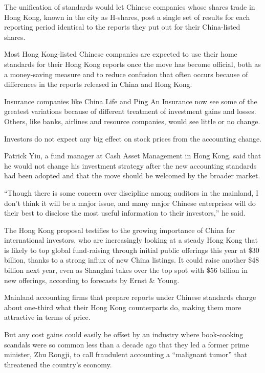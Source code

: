 ﻿\documentclass[12pt]{article}
\begin{document}
The unification of standards would let Chinese companies whose shares trade in Hong Kong, known in
the city as H-shares, post a single set of results for each reporting period identical to the
reports they put out for their China-listed shares.

Most Hong Kong-listed Chinese companies are expected to use their home standards for their Hong Kong
reports once the move has become official, both as a money-saving measure and to reduce confusion
that often occurs because of differences in the reports released in China and Hong Kong.

Insurance companies like China Life and Ping An Insurance now see some of the greatest variations
because of different treatment of investment gains and losses. Others, like banks, airlines and
resource companies, would see little or no change.

Investors do not expect any big effect on stock prices from the accounting change.

Patrick Yiu, a fund manager at Cash Asset Management in Hong Kong, said that he would not change his
investment strategy after the new accounting standards had been adopted and that the move should be
welcomed by the broader market.

``Though there is some concern over discipline among auditors in the mainland, I don't think it will
be a major issue, and many major Chinese enterprises will do their best to disclose the most useful
information to their investors,'' he said.

The Hong Kong proposal testifies to the growing importance of China for international investors, who
are increasingly looking at a steady Hong Kong that is likely to top global fund-raising through
initial public offerings this year at \$30 billion, thanks to a strong influx of new China listings.
It could raise another \$48 billion next year, even as Shanghai takes over the top spot with \$56
billion in new offerings, according to forecasts by Ernst \& Young.

Mainland accounting firms that prepare reports under Chinese standards charge about one-third what
their Hong Kong counterparts do, making them more attractive in terms of price.

But any cost gains could easily be offset by an industry where book-cooking scandals were so common
less than a decade ago that they led a former prime minister, Zhu Rongji, to call fraudulent
accounting a ``malignant tumor'' that threatened the country's economy.
\end{document}

